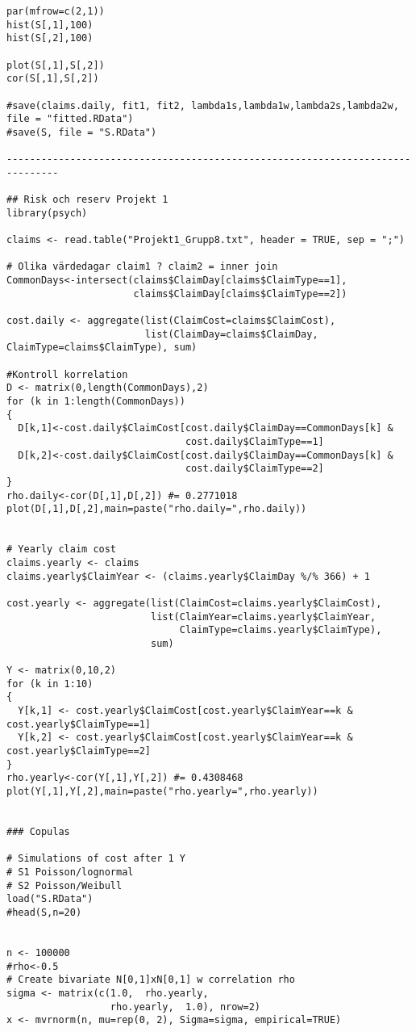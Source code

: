 \documentclass[11pt]{article}
\begin{document}
\begin{verbatim}
par(mfrow=c(2,1))
hist(S[,1],100)
hist(S[,2],100)

plot(S[,1],S[,2])
cor(S[,1],S[,2])

#save(claims.daily, fit1, fit2, lambda1s,lambda1w,lambda2s,lambda2w, file = "fitted.RData")
#save(S, file = "S.RData")

-------------------------------------------------------------------------------

## Risk och reserv Projekt 1
library(psych)

claims <- read.table("Projekt1_Grupp8.txt", header = TRUE, sep = ";")

# Olika värdedagar claim1 ? claim2 = inner join
CommonDays<-intersect(claims$ClaimDay[claims$ClaimType==1],
                      claims$ClaimDay[claims$ClaimType==2])

cost.daily <- aggregate(list(ClaimCost=claims$ClaimCost),
                        list(ClaimDay=claims$ClaimDay, ClaimType=claims$ClaimType), sum)

#Kontroll korrelation
D <- matrix(0,length(CommonDays),2)
for (k in 1:length(CommonDays))
{
  D[k,1]<-cost.daily$ClaimCost[cost.daily$ClaimDay==CommonDays[k] &
                               cost.daily$ClaimType==1]
  D[k,2]<-cost.daily$ClaimCost[cost.daily$ClaimDay==CommonDays[k] &
                               cost.daily$ClaimType==2]
}
rho.daily<-cor(D[,1],D[,2]) #= 0.2771018
plot(D[,1],D[,2],main=paste("rho.daily=",rho.daily))


# Yearly claim cost
claims.yearly <- claims
claims.yearly$ClaimYear <- (claims.yearly$ClaimDay %/% 366) + 1

cost.yearly <- aggregate(list(ClaimCost=claims.yearly$ClaimCost),
                         list(ClaimYear=claims.yearly$ClaimYear,
                              ClaimType=claims.yearly$ClaimType),
                         sum)

Y <- matrix(0,10,2)
for (k in 1:10)
{
  Y[k,1] <- cost.yearly$ClaimCost[cost.yearly$ClaimYear==k & cost.yearly$ClaimType==1]
  Y[k,2] <- cost.yearly$ClaimCost[cost.yearly$ClaimYear==k & cost.yearly$ClaimType==2]
}
rho.yearly<-cor(Y[,1],Y[,2]) #= 0.4308468
plot(Y[,1],Y[,2],main=paste("rho.yearly=",rho.yearly))


### Copulas

# Simulations of cost after 1 Y
# S1 Poisson/lognormal
# S2 Poisson/Weibull
load("S.RData")
#head(S,n=20)


n <- 100000
#rho<-0.5
# Create bivariate N[0,1]xN[0,1] w correlation rho
sigma <- matrix(c(1.0,  rho.yearly,
                  rho.yearly,  1.0), nrow=2)
x <- mvrnorm(n, mu=rep(0, 2), Sigma=sigma, empirical=TRUE)


\end{verbatim}
\end{document}
